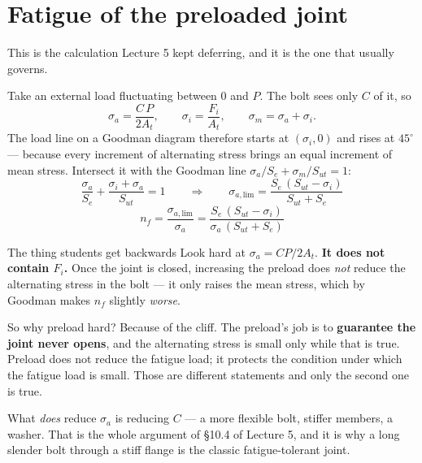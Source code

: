 \documentclass[11pt,a4paper]{article}
\begin{document}
\section{Fatigue of the preloaded joint}
\label{sec:boltfatigue}

This is the calculation Lecture 5 kept deferring, and it is the one that usually governs.

\medskip
Take an external load fluctuating between $0$ and $P$. The bolt sees only $C$ of it, so
\[
\sigma_a=\frac{C\,P}{2A_t},
\qquad
\sigma_i=\frac{F_i}{A_t},
\qquad
\sigma_m=\sigma_a+\sigma_i .
\]
The load line on a Goodman diagram therefore starts at $(\sigma_i,0)$ and rises at
$45^\circ$ --- because every increment of alternating stress brings an equal increment of mean
stress. Intersect it with the Goodman line $\sigma_a/S_e+\sigma_m/S_{ut}=1$:
\[
\frac{\sigma_a}{S_e}+\frac{\sigma_i+\sigma_a}{S_{ut}}=1
\qquad\Longrightarrow\qquad
\sigma_{a,\text{lim}}=\frac{S_e\,(S_{ut}-\sigma_i)}{S_{ut}+S_e}
\]
\[
\boxed{\;n_f=\frac{\sigma_{a,\text{lim}}}{\sigma_a}
=\frac{S_e\,(S_{ut}-\sigma_i)}{\sigma_a\,(S_{ut}+S_e)}\;}
\]

\begin{keybox}{The thing students get backwards}
Look hard at $\sigma_a = CP/2A_t$. \textbf{It does not contain $F_i$.} Once the joint is closed,
increasing the preload does \emph{not} reduce the alternating stress in the bolt --- it only raises
the mean stress, which by Goodman makes $n_f$ slightly \emph{worse}.

\medskip
So why preload hard? Because of the cliff. The preload's job is to \textbf{guarantee the joint never
opens}, and the alternating stress is small only while that is true. Preload does not reduce the
fatigue load; it protects the condition under which the fatigue load is small. Those are different
statements and only the second one is true.

\medskip
What \emph{does} reduce $\sigma_a$ is reducing $C$ --- a more flexible bolt, stiffer members, a
washer. That is the whole argument of \S10.4 of Lecture 5, and it is why a long slender bolt
through a stiff flange is the classic fatigue-tolerant joint.
\end{keybox}
\end{document}
